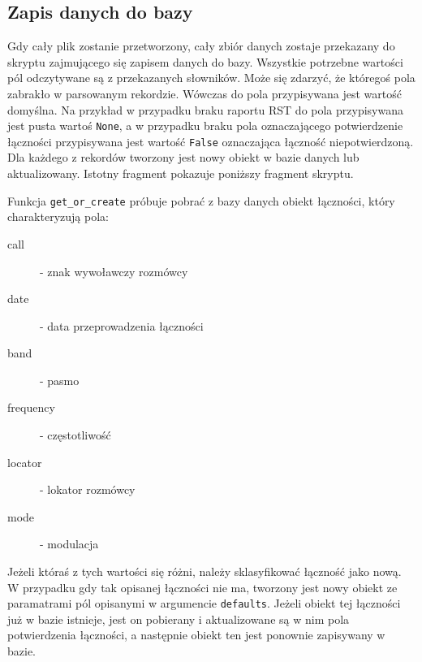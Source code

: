 \documentclass[]{mgr}
\begin{document}
            \subsection{Zapis danych do bazy}
            Gdy cały plik zostanie przetworzony, cały zbiór danych zostaje przekazany do skryptu zajmującego się zapisem danych do bazy. Wszystkie potrzebne wartości pól odczytywane są z przekazanych słowników. Może się zdarzyć, że któregoś pola zabrakło w parsowanym rekordzie. Wówczas do pola przypisywana jest wartość domyślna. Na przykład w przypadku braku raportu RST do pola przypisywana jest pusta wartoś \texttt{None}, a w przypadku braku pola oznaczającego potwierdzenie łączności przypisywana jest wartość \texttt{False} oznaczająca łączność niepotwierdzoną. Dla każdego z rekordów tworzony jest nowy obiekt w bazie danych lub aktualizowany. Istotny fragment pokazuje poniższy fragment skryptu.
            
            Funkcja \texttt{get\_or\_create} próbuje pobrać z bazy danych obiekt łączności, który charakteryzują pola:
            \begin{description}
                \item[call] - znak wywoławczy rozmówcy
                \item[date] - data przeprowadzenia łączności
                \item[band] - pasmo
                \item[frequency] - częstotliwość
                \item[locator] - lokator rozmówcy
                \item[mode] - modulacja
            \end{description}
            Jeżeli któraś z tych wartości się różni, należy sklasyfikować łączność jako nową. W przypadku gdy tak opisanej łączności nie ma, tworzony jest nowy obiekt ze paramatrami pól opisanymi w argumencie \texttt{defaults}. Jeżeli obiekt tej łączności już w bazie istnieje, jest on pobierany i aktualizowane są w nim pola potwierdzenia łączności, a następnie obiekt ten jest ponownie zapisywany w bazie.
\end{document}
